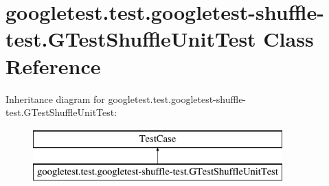 \hypertarget{classgoogletest_1_1test_1_1googletest-shuffle-test_1_1_g_test_shuffle_unit_test}{}\section{googletest.\+test.\+googletest-\/shuffle-\/test.G\+Test\+Shuffle\+Unit\+Test Class Reference}
\label{classgoogletest_1_1test_1_1googletest-shuffle-test_1_1_g_test_shuffle_unit_test}
Inheritance diagram for googletest.\+test.\+googletest-\/shuffle-\/test.G\+Test\+Shuffle\+Unit\+Test\+:\begin{figure}[H]
\begin{center}
\leavevmode
\includegraphics[height=2.000000cm]{d5/d2d/classgoogletest_1_1test_1_1googletest-shuffle-test_1_1_g_test_shuffle_unit_test}
\end{center}
\end{figure}
